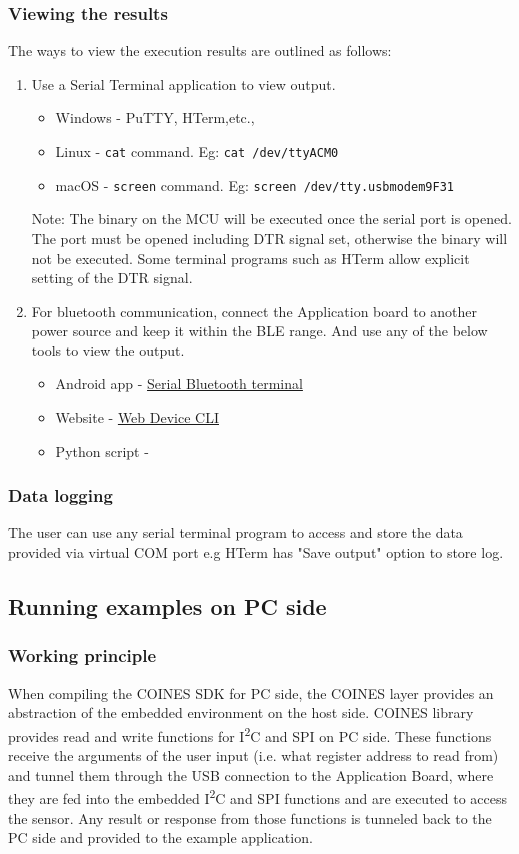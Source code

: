 \documentclass{article}
\begin{document}
\subsubsection{Viewing the results}
The ways to view the execution results are outlined as follows:
\begin{enumerate}
	\item Use a Serial Terminal application to view output.
	\begin{itemize}
		\item Windows - PuTTY, HTerm,etc.,
		\item Linux - \texttt{cat} command. Eg: \texttt{cat /dev/ttyACM0}
		\item macOS - \texttt{screen} command. Eg: \texttt{screen /dev/tty.usbmodem9F31}
	\end{itemize}
	Note: The binary on the MCU will be executed once the serial port is opened. The port must be opened including DTR signal set, otherwise the binary will not be executed. Some terminal programs such as HTerm allow explicit setting of the DTR signal.
	\item For bluetooth communication, connect the Application board to another power source and keep it within the BLE range. And use any of the below tools to view the output.
	\begin{itemize}
		\item Android app - \href{https://play.google.com/store/apps/details?id=de.kai_morich.serial_bluetooth_terminal}{Serial Bluetooth terminal}
		\item Website - \href{https://wiki.makerdiary.com/web-device-cli/}{Web Device CLI}
		\item Python script - 
	\end{itemize}
\end{enumerate}

\subsubsection{Data logging}
The user can use any serial terminal program to access and store the data provided via virtual COM port e.g HTerm has "Save output" option to store log.

\subsection{Running examples on PC side}
\subsubsection{Working principle}
When compiling the COINES SDK for PC side, the COINES layer provides an abstraction of the embedded environment on the host side. COINES library provides read and write functions for I\textsuperscript{2}C and SPI on PC side. These functions receive the arguments of the user input (i.e. what register address to read from) and tunnel them through the USB connection to the Application Board, where they are fed into the embedded I\textsuperscript{2}C and SPI functions and are executed to access the sensor. Any result or response from those functions is tunneled back to the PC side and provided to the example application.
\end{document}
